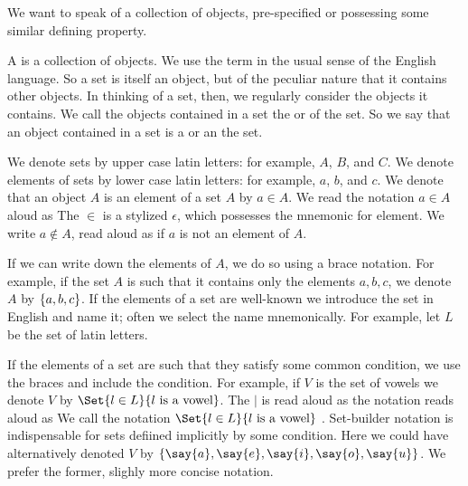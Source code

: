 
\sbasic



\sstart



We want to speak of a collection of objects,
pre-specified or possessing some similar
defining property.


A  is a collection of objects.
We use the term  in the
usual sense of the English language.
So a set is itself an object, but of the peculiar nature
that it contains other objects.
In thinking of a set, then, we regularly consider the
objects it contains.
We call the objects contained in a set the
 or
 of the set.
So we say that an object contained in a set is a
 or an
 the set.


We denote sets by upper case latin letters: for example, $A$, $B$, and $C$.
We denote elements of sets by lower case latin letters: for example, $a$, $b$, and $c$.
We denote that an object $A$ is an element of a set $A$ by $a \in A$.
We read the notation $a \in A$ aloud as 
The $\in$ is a stylized $\epsilon$, which possesses the mnemonic for element.
We write $a \not\in A$, read aloud as  if $a$ is not an element of $A$.

If we can write down the elements of $A$, we do so using a brace notation.
For example, if the set $A$ is such that it contains only the elements $a, b, c$, we denote $A$ by $\{a, b, c\}$.
If the elements of a set are well-known we introduce the set in English and name it; often we select the name mnemonically.
For example, let $L$ be the set of latin letters.

If the elements of a set are such that they satisfy some common condition, we use the braces and include the condition.
For example, if $V$ is the set of vowels we denote $V$ by $\Set{l \in L}{l \text{ is a vowel}}$.
The $\mid$ is read aloud as  the notation reads aloud as 
We call the notation $\Set{l \in L}{l \text{ is a vowel}}$ .
Set-builder notation is indispensable for sets defiined implicitly by some condition.
Here we could have alternatively denoted $V$ by $\set{\say{a},\say{e},\say{i},\say{o},\say{u}}$.
We prefer the former, slighly more concise notation.

